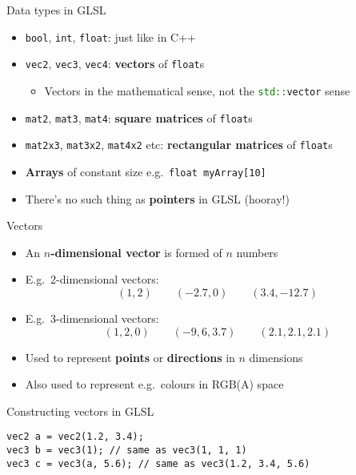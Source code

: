 
\begin{frame}{Data types in GLSL}
	\begin{itemize}
		\pause\item \lstinline{bool}, \lstinline{int}, \lstinline{float}: just like in C++
		\pause\item \lstinline{vec2}, \lstinline{vec3}, \lstinline{vec4}: \textbf{vectors} of \lstinline{float}s
			\begin{itemize}
				\pause\item Vectors in the mathematical sense, not the \lstinline[language=C++]{std::vector} sense
			\end{itemize}
		\pause\item \lstinline{mat2}, \lstinline{mat3}, \lstinline{mat4}: \textbf{square matrices} of \lstinline{float}s
		\pause\item \lstinline{mat2x3}, \lstinline{mat3x2}, \lstinline{mat4x2} etc: \textbf{rectangular matrices} of \lstinline{float}s
		\pause\item \textbf{Arrays} of constant size e.g.\ \lstinline{float myArray[10]}
		\pause\item There's no such thing as \textbf{pointers} in GLSL (hooray!)
	\end{itemize}
\end{frame}

\begin{frame}{Vectors}
	\begin{itemize}
		\pause\item An \textbf{$n$-dimensional vector} is formed of $n$ numbers
		\pause\item E.g.\ 2-dimensional vectors:
			$$ (1, 2) \qquad (-2.7, 0) \qquad (3.4, -12.7) $$
		\pause\item E.g.\ 3-dimensional vectors:
			$$ (1, 2, 0) \qquad (-9, 6, 3.7) \qquad (2.1, 2.1, 2.1) $$
		\pause\item Used to represent \textbf{points} or \textbf{directions} in $n$ dimensions
		\pause\item Also used to represent e.g.\ colours in RGB(A) space
	\end{itemize}
\end{frame}

\begin{frame}[fragile]{Constructing vectors in GLSL}
	\begin{lstlisting}
vec2 a = vec2(1.2, 3.4);
vec3 b = vec3(1); // same as vec3(1, 1, 1)
vec3 c = vec3(a, 5.6); // same as vec3(1.2, 3.4, 5.6)
	\end{lstlisting}
\end{frame}

